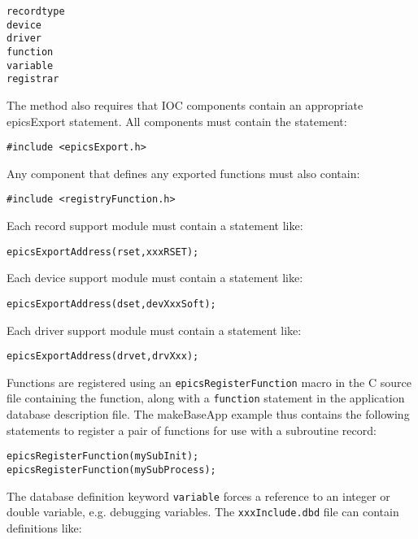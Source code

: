 \begin{verbatim}
recordtype
device
driver
function
variable
registrar
\end{verbatim}

The method also requires that IOC components contain an appropriate epicsExport statement. All components must 
contain the statement:

\begin{verbatim}
#include <epicsExport.h>
\end{verbatim}

Any component that defines any exported functions must also contain:

\begin{verbatim}
#include <registryFunction.h>
\end{verbatim}

Each record support module must contain a statement like:

\begin{verbatim}
epicsExportAddress(rset,xxxRSET);
\end{verbatim}

Each device support module must contain a statement like:

\begin{verbatim}
epicsExportAddress(dset,devXxxSoft);
\end{verbatim}

Each driver support module must contain a statement like:

\begin{verbatim}
epicsExportAddress(drvet,drvXxx);
\end{verbatim}

Functions are registered using an \verb|epicsRegisterFunction| macro in the C source file containing the function, along
with a \verb|function| statement in the application database description file.  The makeBaseApp example thus contains the
following statements to register a pair of functions for use with a subroutine record:

\begin{verbatim}
epicsRegisterFunction(mySubInit);
epicsRegisterFunction(mySubProcess);
\end{verbatim}

The database definition keyword \verb|variable| forces a reference to an integer or double variable, e.g. debugging variables.
The \verb|xxxInclude.dbd| file can contain definitions like:

